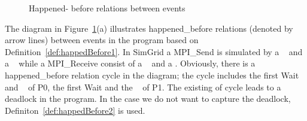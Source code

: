 \documentclass[a4paper,11pt]{article}
\begin{document}
\begin{itemize}[noitemsep]
 \begin{figure}[H]
\label{fig:hapend_before}
\hfill
{}
\caption{Happened- before relations between events}
\end{figure}

The diagram in Figure~\ref{fig:hapend_before}(a) illustrates happened\_before relations (denoted by arrow lines) between events in the program based on Definition~\ref{def:happedBefore1}. In SimGrid a MPI\_Send is simulated by a \asynsend~ and a \wait~ while a MPI\_Receive consist of a \asynreceive~ and a \wait. Obviously, there is a happened\_before relation cycle in the diagram; the cycle includes the first Wait and \asynreceive~ of P0, the first Wait and the \asynreceive~ of P1. The existing of cycle leads to a deadlock in the program. In the case we do not want to capture the deadlock, Definiton~\ref{def:happedBefore2} is used.


\end{itemize}
\end{document}
